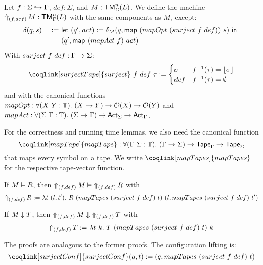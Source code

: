 \begin{definition}
  \label{def:LiftAlphabet}
  Let $f : \Sigma \hookrightarrow \Tau$, $def:\Sigma$, and $M : \TM_\Sigma^n(L)$.  We define the machine %
  $\LiftAlphabet{M}{(f,def)} : \TM_\Tau^n(L)$ with the same components as $M$, except:
  \begin{alignat*}{2}
    & \delta(q,s)    &~:=~& \Let{(q', act) := \delta_M(q, \map{(mapOpt~(surject~f~def))}{s})}{\\%
    &                &~  ~& (q', \map{(mapAct~f)}{act})} \\
  \end{alignat*}
  With $surject~f~def : \Tau \to \Sigma$:
  \[
    \coqlink[surjectTape]{surject}~f~def~\tau :=
    \begin{cases}
      \sigma & f^{-1}(\tau) = \Some{\sigma} \\
      def & f^{-1}(\tau) = \None
    \end{cases}
  \]
  and with the canonical functions $mapOpt: \forall (X~Y:\Type).~ (X \to Y) \to \Option(X) \to \Option(Y)$ and
  $mapAct : \forall (\Sigma~\Tau:\Type).~(\Sigma\to\Tau) \to \Act_\Sigma \to \Act_\Tau$.
\end{definition}

%
For the correctness and running time lemmas, we also need the canonical function
\[
  \coqlink[mapTape]{mapTape}:\forall (\Tau~\Sigma:\Type).~(\Tau\to\Sigma)\to\Tape_\Tau\to\Tape_\Sigma
\]
that maps every symbol on a tape.  We write $\coqlink[mapTapes]{mapTapes}$ for the respective tape-vector function.
%

\begin{lemma}
  \label{lem:LiftAlphabet_Realise}
  If $M \Realise R$, then $\LiftAlphabet{M}{(f,def)} \Realise \LiftAlphabet{R}{(f,def)}$ with
  \small
  \[
    \LiftAlphabet{R}{(f,def)} := \lambda t~(l, t').~R~(mapTapes~(surject~f~def)~t)~(l, mapTapes~(surject~f~def)~t')
  \]
\end{lemma}

\begin{lemma}
  \label{lem:LiftAlphabet_TerminatesIn}
  If $M \TerminatesIn T$, then $\LiftAlphabet{M}{(f,def)} \TerminatesIn \LiftAlphabet{T}{(f,def)}$ with
  \[
    \LiftAlphabet{T}{(f,def)} := \lambda t~k.~T~(mapTapes~(surject~f~def)~t)~k
  \]
\end{lemma}

The proofs are analogous to the former proofs.  The configuration lifting is:
\[
  \coqlink[surjectConf]{surjectConf} (q,t) := (q, mapTapes~(surject~f~def)~t)
\]



